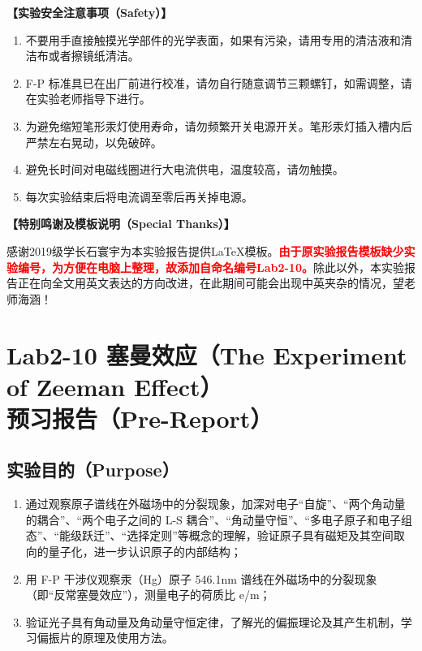 \documentclass[dvipsnames, svgnames,a4paper,11pt]{article}
\begin{document}
	\textbf{【实验安全注意事项（Safety）】}	
	\begin{enumerate}
		\small %
		\item 不要用手直接触摸光学部件的光学表面，如果有污染，请用专用的清洁液和清洁布或者擦镜纸清洁。
		\item F-P 标准具已在出厂前进行校准，请勿自行随意调节三颗螺钉，如需调整，请在实验老师指导下进行。
		\item 为避免缩短笔形汞灯使用寿命，请勿频繁开关电源开关。笔形汞灯插入槽内后严禁左右晃动，以免破碎。
		\item 避免长时间对电磁线圈进行大电流供电，温度较高，请勿触摸。
		\item 每次实验结束后将电流调至零后再关掉电源。
	\end{enumerate}
	
	
	\textbf{【特别鸣谢及模板说明（Special Thanks）】}	
	
	感谢2019级学长石寰宇为本实验报告提供\LaTeX 模板。\textcolor{red}{\textbf{由于原实验报告模板缺少实验编号，为方便在电脑上整理，故添加自命名编号Lab2-10。}}除此以外，本实验报告正在向全文用英文表达的方向改进，在此期间可能会出现中英夹杂的情况，望老师海涵！
	
	
	
	\clearpage
	\tableofcontents
	\clearpage
	
	
	
	
	\setcounter{section}{0}
	\section{Lab2-10 塞曼效应（The Experiment of Zeeman Effect）\\ \quad\heiti 预习报告（Pre-Report）}
	
	\subsection{实验目的（Purpose）}
	\begin{enumerate}
		\item 通过观察原子谱线在外磁场中的分裂现象，加深对电子“自旋”、“两个角动量的耦合”、“两个电子之间的 L-S 耦合”、“角动量守恒”、“多电子原子和电子组态”、“能级跃迁”、“选择定则”等概念的理解，验证原子具有磁矩及其空间取向的量子化，进一步认识原子的内部结构；
		\item 用 F-P 干涉仪观察汞（Hg）原子 546.1nm 谱线在外磁场中的分裂现象（即“反常塞曼效应”），测量电子的荷质比 e/m；
		\item 验证光子具有角动量及角动量守恒定律，了解光的偏振理论及其产生机制，学习偏振片的原理及使用方法。
	\end{enumerate}
	
\end{document}
